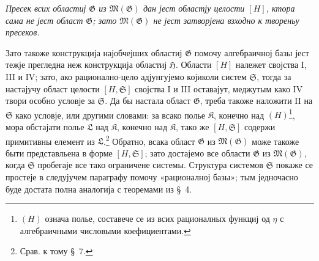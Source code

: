 ﻿\documentclass[11pt]{article}
\begin{document}
{\itshape Пресек всих областиј $\mathfrak G$ из $\mathfrak M(\mathfrak G)$ дан
јест областју целости $[H]$, ктора сама не јест област $\mathfrak G$; зато
$\mathfrak M(\mathfrak G)$ не јест затворјена взходно к твореньу пресеков.}

Зато такоже конструкција најобчејших областиј $\mathfrak G$ помочу алгебраичној
базы јест тежје прегледна неж конструкција областиј $\mathfrak H$. Области $[H]$
належет својства I, III и IV; зато, ако рационално-цело адјунгујемо којиколи
систем $\mathfrak S$, тогда за настајучу област целости $[H,\mathfrak S]$
својства I и III оставајут, меджутым како IV твори особно условје за
$\mathfrak S$. Да бы настала област $\mathfrak G$, треба такоже наложити II на
$\mathfrak S$ како условје, или другими словами: за всако полье $\mathfrak K$,
конечно над $(H)$\footnote{$(H)$ означа полье, составече се из всих рационалных
функциј од $\eta$ с алгебраичными числовыми коефициентами.}, мора обстајати
полье $\mathfrak L$ над $\mathfrak K$, конечно над $\mathfrak K$, тако же
$[H,\mathfrak S]$ содержи примитивны елемент из $\mathfrak L$.\footnote{Срав. к
тому \S\ 7.} Обратно, всака област $\mathfrak G$ из
$\mathfrak M(\mathfrak G)$ може такоже быти представльена в форме
$[H,\mathfrak S]$; зато достајемо все области $\mathfrak G$ из
$\mathfrak M(\mathfrak G)$, когда $\mathfrak S$ пробегаје все тако ограничене
системы. Структура системов $\mathfrak S$ покаже се простеје в следујучем
параграфу помочу «рационалној базы»; тым једночасно буде достата полна аналогија
с теоремами из \S\ 4.
\end{document}
